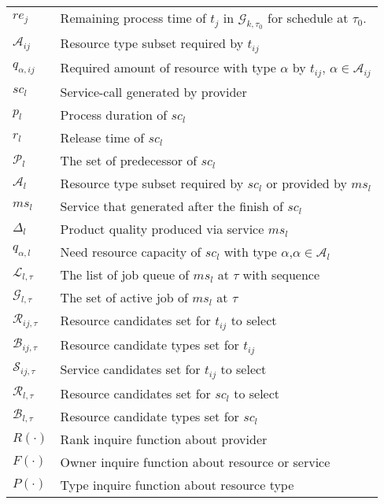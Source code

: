 \begin{table}[htbp]
\begin{tabularx}{\textwidth}{|lX|}
    $re_j$ & Remaining process time of $t_j$ in $\mathcal{G}_{k,\tau_0}$ for schedule at $\tau_0$. \\
    $\mathcal{A}_{ij}$ & Resource type subset required by $t_{ij}$\\ %
    $q_{\alpha,ij}$ & Required amount of resource with type $\alpha$ by $t_{ij}$, $\alpha\in\mathcal{A}_{ij}$\\
    $sc_l$ & Service-call generated by provider\\
    $p_l$ & Process duration of $sc_l$\\
    $r_l$ & Release time of $sc_l$\\
    $\mathcal{P}_{l}$ & The set of predecessor of $sc_{l}$\\
    $\mathcal{A}_l$ & Resource type subset required by $sc_l$ or provided by $ms_l$ \\ %
    $ms_l$ & Service that generated after the finish of $sc_l$\\
    $\Delta_l$ & Product quality produced via service $ms_l$\\
    $q_{\alpha,l}$ & Need resource capacity of $sc_l$ with type $\alpha$,$\alpha\in\mathcal{A}_{l}$\\
    $\mathcal{L}_{l,\tau}$ & The list of job queue of $ms_l$ at $\tau$ with sequence\\
    $\mathcal{G}_{l,\tau}$ & The set of active job of $ms_l$ at $\tau$ \\
    $\mathcal{R}_{ij,\tau}$ & Resource candidates set for $t_{ij}$ to select\\
    $\mathcal{B}_{ij,\tau}$ & Resource candidate types set for $t_{ij}$\\
    $\mathcal{S}_{ij,\tau}$ & Service candidates set for $t_{ij}$ to select\\
    $\mathcal{R}_{l,\tau}$ & Resource candidates set for $sc_l$ to select\\
    $\mathcal{B}_{l,\tau}$ & Resource candidate types set for $sc_l$\\
    $R(\cdot)$ & Rank inquire function about provider\\
    $F(\cdot)$ & Owner inquire function about resource or service\\
    $P(\cdot)$ & Type inquire function about resource type\\
    \hline
\end{tabularx}
\end{table}
